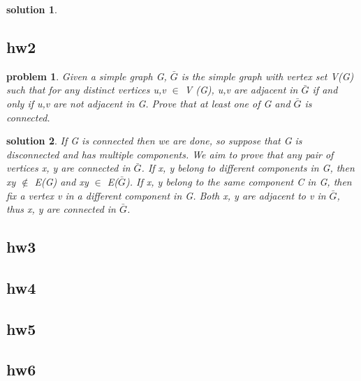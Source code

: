 \documentclass[twocolumn]{article}
\newtheorem{problem}{problem}
\newtheorem{solution}{solution}
\begin{document}
\begin{CJK*}{UTF8}{bkai}
\begin{solution}
    \end{solution}
    
\subsection{hw2}
    \begin{problem}
        Given a simple graph G, $\bar{G}$ is the simple graph with vertex set V(G) such that for any distinct
 vertices u,v $\in$ V (G), u,v are adjacent in $\bar{G}$ if and only if u,v are not adjacent in G.
 Prove that at least one of G and $\bar{G}$ is connected.
    \end{problem}

    \begin{solution}
        If G is connected then we are done, so suppose that G is disconnected and has multiple components.
We aim to prove that any pair of vertices x, y are connected in $\bar{G}$. If x, y belong to different
components in G, then xy $\notin$ E(G) and xy $\in$ E($\bar{G}$). If x, y belong to the same component C in G,
then fix a vertex v in a different component in G. Both x, y are adjacent to v in $\bar{G}$, thus x, y are
connected in $\bar{G}$.

    \end{solution}

\subsection{hw3}

\subsection{hw4}

\subsection{hw5}

\subsection{hw6}

\end{CJK*}
\end{document}
